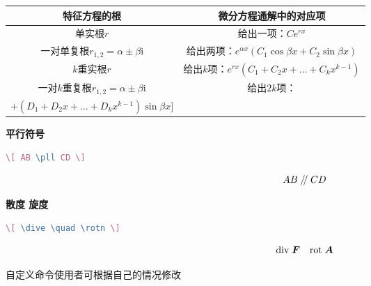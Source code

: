 \documentclass[12pt, a4paper, oneside, UTF8]{ctexbook}
\begin{document}
    \begin{table}[htbp!]
        \centering
        \begin{tabular}{|c|c|}
            \hline
            特征方程的根                                        & 微分方程通解中的对应项                                                                 \\
            \hline
            单实根$r$                                           & 给出一项：$Ce^{rx}$                                                                    \\
            \hline
            一对单复根$r_{1,2} = \alpha \pm \beta\mathrm{i}$    & 给出两项：$e^{\alpha{x}}(C_1\cos\beta{x}+C_2\sin\beta{x})$                             \\
            \hline
            $k$重实根$r$                                        & 给出$k$项：$e^{rx}(C_1+C_2x+\dots+C_kx^{k-1})$                                         \\
            \hline
            一对$k$重复根$r_{1,2} = \alpha \pm \beta\mathrm{i}$ & 给出$2k$项：\tabincell{c}{$e^{\alpha{x}} \big[(C_1+C_2x+\dots+C_kx^{k-1})\cos\beta{x}$ \\ $+ (D_1+D_2x+\dots+D_kx^{k-1})\sin\beta{x} \big]$} \\
            \hline
        \end{tabular}
    \end{table}


    \textbf{平行符号}

    \begin{lstlisting}[language=TeX]
        \[ AB \pll CD \]
    \end{lstlisting}

    \[ AB \kern 0.56em/\kern -0.8em /\kern 0.56em CD \]

    \textbf{散度 旋度}

    \begin{lstlisting}[language=TeX]
        \[ \dive \quad \rotn \]
    \end{lstlisting}

    \[ \mathrm{div}\;\boldsymbol{F} \quad \mathrm{rot}\;\boldsymbol{A} \]

    自定义命令使用者可根据自己的情况修改

\ifx\allfiles\undefined
\end{document}
